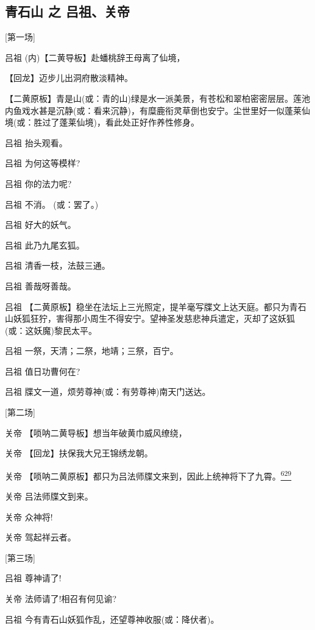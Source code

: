 \newpage
{} %
\hypertarget{ux9752ux77f3ux5c71-ux4e4b-ux5415ux7956ux5173ux5e1d}{%
\subsection{青石山 之
吕祖、关帝}\label{ux9752ux77f3ux5c71-ux4e4b-ux5415ux7956ux5173ux5e1d}}

{[}第一场{]}

吕祖 (内)【二黄导板】赴蟠桃辞王母离了仙境，

【回龙】迈步儿出洞府散淡精神。

【二黄原板】青是山(或：青的山)绿是水一派美景，有苍松和翠柏密密层层。莲池内鱼戏水甚是沉静(或：看来沉静)，有糜鹿衔灵草倒也安宁。尘世里好一似蓬莱仙境(或：胜过了蓬莱仙境)，看此处正好作养性修身。

吕祖 抬头观看。

吕祖 为何这等模样?

吕祖 你的法力呢?

吕祖 不消。 (或：罢了。)

吕祖 好大的妖气。

吕祖 此乃九尾玄狐。

吕祖 清香一枝，法鼓三通。

吕祖 善哉呀善哉。

吕祖
【二黄原板】稳坐在法坛上三光照定，提羊毫写牒文上达天庭。都只为青石山妖狐狂狞，害得那小周生不得安宁。望神圣发慈悲神兵遣定，灭却了这妖狐(或：这妖魔)黎民太平。

吕祖 一祭，天清；二祭，地靖；三祭，百宁。

吕祖 值日功曹何在?

吕祖 牒文一道，烦劳尊神(或：有劳尊神)南天门送达。

{[}第二场{]}

关帝 【唢呐二黄导板】想当年破黄巾威风缭绕，

关帝 【回龙】扶保我大兄王锦绣龙朝。

关帝
【唢呐二黄原板】都只为吕法师牒文来到，因此上统神将下了九霄。\protect\hyperlink{fn629}{\textsuperscript{629}}

关帝 吕法师牒文到来。

关帝 众神将!

关帝 驾起祥云者。

{[}第三场{]}

吕祖 尊神请了!

关帝 法师请了!相召有何见谕?

吕祖 今有青石山妖狐作乱，还望尊神收服(或：降伏者)。

